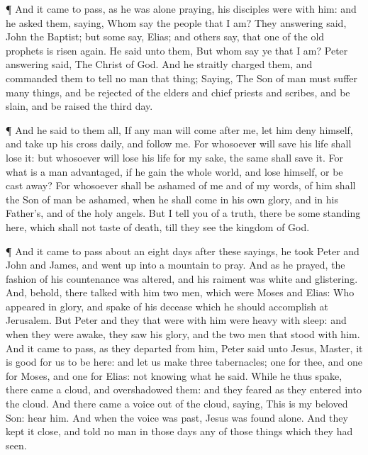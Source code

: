  ¶ And it came to pass, as he was alone praying, his
disciples were with him: and he asked them, saying, Whom say the people
that I am?  They answering said, John the Baptist; but some
say, Elias; and others say, that one of the old prophets is risen again.
 He said unto them, But whom say ye that I am? Peter
answering said, The Christ of God.  And he straitly charged
them, and commanded them to tell no man that thing; 
Saying, The Son of man must suffer many things, and be rejected of the
elders and chief priests and scribes, and be slain, and be raised the
third day.

 ¶ And he said to them all, If any man will come after me,
let him deny himself, and take up his cross daily, and follow me.
 For whosoever will save his life shall lose it: but
whosoever will lose his life for my sake, the same shall save it.
 For what is a man advantaged, if he gain the whole world,
and lose himself, or be cast away?  For whosoever shall be
ashamed of me and of my words, of him shall the Son of man be ashamed,
when he shall come in his own glory, and in his Father's, and of the
holy angels.  But I tell you of a truth, there be some
standing here, which shall not taste of death, till they see the kingdom
of God.

 ¶ And it came to pass about an eight days after these
sayings, he took Peter and John and James, and went up into a mountain
to pray.  And as he prayed, the fashion of his countenance
was altered, and his raiment was white and glistering. 
And, behold, there talked with him two men, which were Moses and Elias:
 Who appeared in glory, and spake of his decease which he
should accomplish at Jerusalem.  But Peter and they that
were with him were heavy with sleep: and when they were awake, they saw
his glory, and the two men that stood with him.  And it
came to pass, as they departed from him, Peter said unto Jesus, Master,
it is good for us to be here: and let us make three tabernacles; one for
thee, and one for Moses, and one for Elias: not knowing what he said.
 While he thus spake, there came a cloud, and overshadowed
them: and they feared as they entered into the cloud.  And
there came a voice out of the cloud, saying, This is my beloved Son:
hear him.  And when the voice was past, Jesus was found
alone. And they kept it close, and told no man in those days any of
those things which they had seen.

